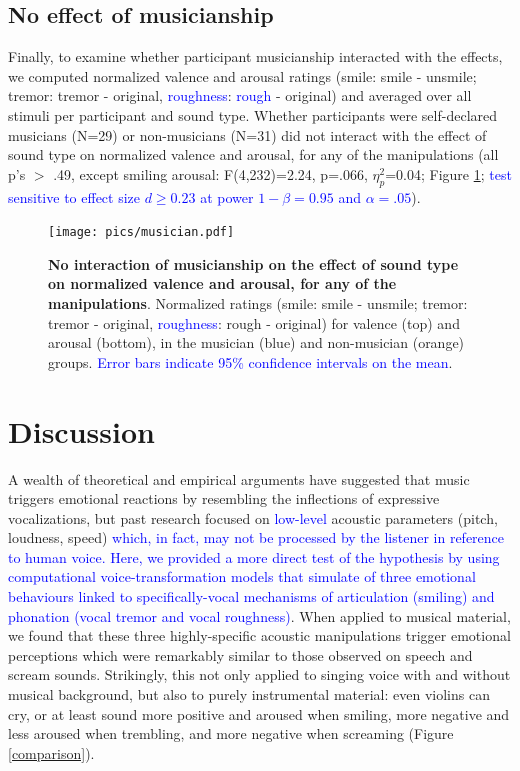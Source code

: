 \documentclass[openacc]{rsprocb_new}%
\begin{document}
\subsection{No effect of musicianship}

Finally, to examine whether participant musicianship interacted with the effects, we computed normalized valence and arousal ratings (smile: smile - unsmile; tremor: tremor - original, \textcolor{blue}{roughness}: \textcolor{blue}{rough} - original) and averaged over all stimuli per participant and sound type. Whether participants were self-declared musicians (N=29) or non-musicians (N=31) did not interact with the effect of sound type on normalized valence and arousal, for any of the manipulations (all p's $>$ .49, except smiling arousal: F(4,232)=2.24, p=.066, $\eta_p^2$=0.04; Figure \ref{musician}; \textcolor{blue}{test sensitive to effect size $d\geq0.23$ at power $1-\beta=0.95$ and $\alpha=.05$}).  

\begin{figure}[htbp]
\centerline{\texttt{[image: pics/musician.pdf]}}
\caption{{\bf No interaction of musicianship on the effect of sound type on normalized valence and arousal, for any of the manipulations}. Normalized ratings (smile: smile - unsmile; tremor: tremor - original, \textcolor{blue}{roughness}: rough - original) for valence (top) and arousal (bottom), in the musician (blue) and non-musician (orange) groups. \textcolor{blue}{Error bars indicate 95\% confidence intervals on the mean}.}
\label{musician}
\end{figure}

\section*{Discussion}

A wealth of theoretical and empirical arguments have suggested that music triggers emotional reactions by resembling the inflections of expressive vocalizations, but past research focused on \textcolor{blue}{low-level} acoustic parameters (pitch, loudness, speed) \textcolor{blue}{which, in fact, may not be processed by the listener in reference to human voice. Here, we provided a more direct test of the hypothesis by using computational voice-transformation models that simulate of three emotional behaviours linked to specifically-vocal mechanisms of articulation (smiling) and phonation (vocal tremor and vocal roughness)}. When applied to musical material, we found that these three highly-specific acoustic manipulations trigger emotional perceptions which were remarkably similar to those observed on speech and scream sounds. Strikingly, this not only applied to singing voice with and without musical background, but also to purely instrumental material: even violins can cry, or at least sound more positive and aroused when smiling, more negative and less aroused when trembling, and more negative when screaming (Figure \ref{comparison}). 
\end{document}
